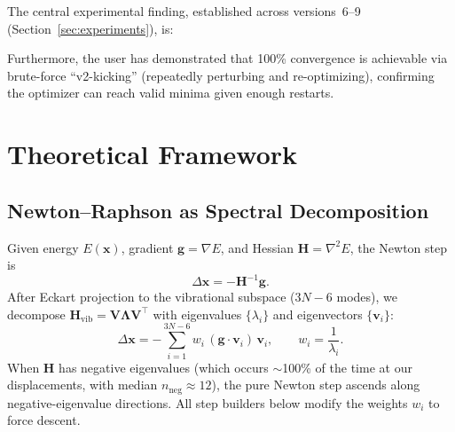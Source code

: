 \documentclass[11pt,a4paper]{article}
\newcommand{\vect}[1]{\bm{#1}}
\newcommand{\mat}[1]{\mathbf{#1}}
\theoremstyle{definition}
\begin{document}
The central experimental finding, established across versions~6--9 (Section~\ref{sec:experiments}), is:
\begin{center}
\end{center}

Furthermore, the user has demonstrated that 100\% convergence is achievable
via brute-force ``v2-kicking'' (repeatedly perturbing and re-optimizing),
confirming the optimizer can reach valid minima given enough restarts.

\section{Theoretical Framework}
\label{sec:theory}

\subsection{Newton--Raphson as Spectral Decomposition}
\label{sec:nr-spectral}

Given energy $E(\vect{x})$, gradient $\vect{g} = \nabla E$, and Hessian
$\mat{H} = \nabla^2 E$, the Newton step is
\begin{equation}
  \Delta\vect{x} = -\mat{H}^{-1}\vect{g}.
\end{equation}
After Eckart projection to the vibrational subspace ($3N{-}6$ modes), we
decompose $\mat{H}_\text{vib} = \mat{V}\mat{\Lambda}\mat{V}^\top$ with
eigenvalues $\{\lambda_i\}$ and eigenvectors $\{\vect{v}_i\}$:
\begin{equation}
  \Delta\vect{x} = -\sum_{i=1}^{3N-6} w_i \, (\vect{g}\cdot\vect{v}_i) \, \vect{v}_i,
  \qquad w_i = \frac{1}{\lambda_i}.
  \label{eq:spectral-step}
\end{equation}
When $\mat{H}$ has negative eigenvalues (which occurs $\sim$100\% of the time at our
displacements, with median $n_\text{neg} \approx 12$), the pure Newton step
ascends along negative-eigenvalue directions.  All step builders below modify
the weights $w_i$ to force descent.
\end{document}
